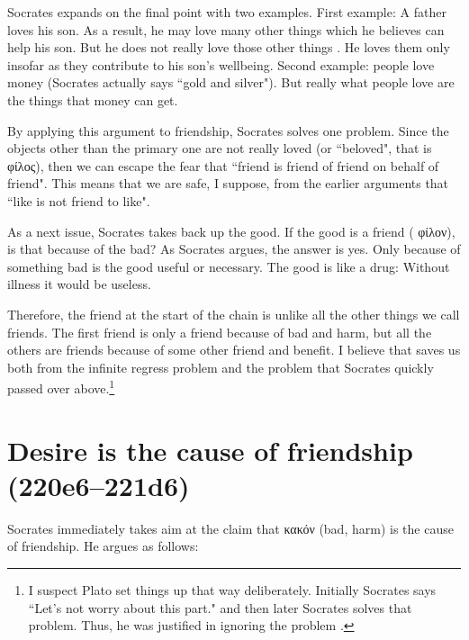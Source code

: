 \documentclass[11pt]{article}
\begin{document}
Socrates expands on the final point with two examples.  First example: A father
loves his son.  As a result, he may love many other things which he believes
can help his son.  But he does not really love those other things . He loves them only insofar as they contribute to his son's wellbeing.
Second example: people love money (Socrates actually says ``gold and silver").
But really what people love are the things that money can get.

By applying this argument to friendship, Socrates solves one problem.  Since
the objects other than the primary one are not really loved (or ``beloved",
that is {\g φίλος}), then we can escape the fear that ``friend is friend of
friend on behalf of friend".  This means that we are safe, I suppose, from the
earlier arguments that ``like is not friend to like".

As a next issue, Socrates takes back up the good.  If the good is a friend ({\g
φίλον}), is that because of the bad?  As Socrates argues, the answer is yes.
Only because of something bad is the good useful or necessary.  The good is
like a drug: Without illness it would be useless.

Therefore, the friend at the start of the chain is unlike all the other things
we call friends.  The first friend is only a friend because of bad and harm,
but all the others are friends because of some other friend and benefit.
I believe that saves us both from the infinite regress problem and the problem
that Socrates quickly passed over above.\footnote{I suspect Plato set things up
that way deliberately.  Initially Socrates says ``Let's not worry about this
part." and then later Socrates solves that problem.  Thus, he was justified in
ignoring the problem .}


\section{Desire is the cause of friendship (220e6--221d6)}

Socrates immediately takes aim at the claim that {\g κακόν} (bad, harm) is the
cause of friendship.  He argues as follows:
\end{document}
